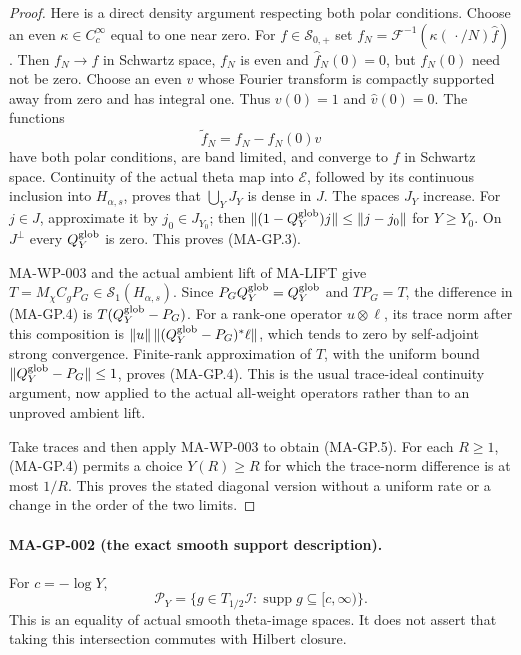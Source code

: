 \begin{proof}
Here is a direct density argument respecting both polar conditions.
Choose an even $\kappa\in C_c^\infty$ equal to one near zero.
For $f\in\mathscr S_{0,+}$ set
$f_N=\mathcal F^{-1}(\kappa(\,\cdot/N)\widehat f)$.
Then $f_N\to f$ in Schwartz space, $f_N$ is even and
$\widehat f_N(0)=0$, but $f_N(0)$ need not be zero.
Choose an even $v$ whose Fourier transform is compactly supported
away from zero and has integral one.  Thus
$v(0)=1$ and $\widehat v(0)=0$.
The functions
\[
                         \widetilde f_N=f_N-f_N(0)v
 \tag{MA-GP.6}
\]
have both polar conditions, are band limited, and converge to $f$
in Schwartz space.  Continuity of the actual theta map into
$\mathcal E$, followed by its continuous inclusion into
$H_{\alpha,s}$, proves that $\bigcup_YJ_Y$ is dense in $J$.
The spaces $J_Y$ increase.  For $j\in J$, approximate it by
$j_0\in J_{Y_0}$; then
$\|(1-Q_Y^{\rm glob})j\|\le\|j-j_0\|$ for $Y\ge Y_0$.
On $J^\perp$ every $Q_Y^{\rm glob}$ is zero.  This proves
(MA-GP.3).

MA-WP-003 and the actual ambient lift of MA-LIFT give
$T=M_\chi C_gP_G\in\mathcal S_1(H_{\alpha,s})$.
Since $P_GQ_Y^{\rm glob}=Q_Y^{\rm glob}$ and $TP_G=T$,
the difference in (MA-GP.4) is $T(Q_Y^{\rm glob}-P_G)$.
For a rank-one operator $u\otimes\ell$, its trace norm after
this composition is $\|u\|\,\|(Q_Y^{\rm glob}-P_G)^*\ell\|$,
which tends to zero by self-adjoint strong convergence.
Finite-rank approximation of $T$, with the uniform bound
$\|Q_Y^{\rm glob}-P_G\|\le1$, proves (MA-GP.4).
This is the usual trace-ideal continuity argument, now applied
to the actual all-weight operators rather than to an unproved
ambient lift.

Take traces and then apply MA-WP-003 to obtain (MA-GP.5).
For each $R\ge1$, (MA-GP.4) permits a choice $Y(R)\ge R$
for which the trace-norm difference is at most $1/R$.
This proves the stated diagonal version without a uniform
rate or a change in the order of the two limits.
\end{proof}

\paragraph{MA-GP-002 (the exact smooth support description).}
For $c=-\log Y$,
\[
 \mathscr P_Y
   =\{g\in T_{1/2}\mathcal I:
                              \operatorname{supp}g\subseteq[c,\infty)\}.
 \tag{MA-GP.7}
\]
This is an equality of actual smooth theta-image spaces.  It
does not assert that taking this intersection commutes with
Hilbert closure.

